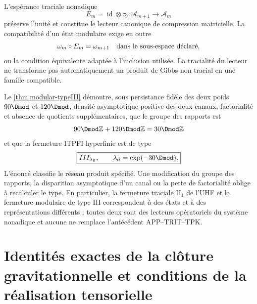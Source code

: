 L'espérance traciale nonadique
\begin{equation}
 E_m=\operatorname{id}\otimes\tau_9:
 \mathcal A_{m+1}\longrightarrow\mathcal A_m
 \label{eq:rm-info-tracial-expectation}
\end{equation}
préserve l'unité et constitue le lecteur canonique de compression
matricielle. La compatibilité d'un état modulaire exige en outre
\begin{equation}
 \omega_m\circ E_m=\omega_{m+1}
 \quad\hbox{dans le sous-espace déclaré,}
 \label{eq:rm-info-expectation-state}
\end{equation}
ou la condition équivalente adaptée à l'inclusion utilisée. La
tracialité du lecteur ne transforme pas automatiquement un produit de Gibbs non
tracial en une famille compatible.

Le \cref{thm:modular-typeIII} démontre, sous persistance fidèle des deux
poids \(90\Dmod\) et \(120\Dmod\), densité asymptotique positive des deux
canaux, factorialité et absence de quotients supplémentaires, que le groupe des
rapports est
\begin{equation}
 90\Dmod\mathbb Z+120\Dmod\mathbb Z
 =30\Dmod\mathbb Z
 \label{eq:rm-info-ratio-group}
\end{equation}
et que la fermeture ITPFI hyperfinie est de type
\begin{equation}
 \boxed{
 III_{\lambda_\partial},
 \qquad
 \lambda_\partial=\exp(-30\Dmod).}
 \label{eq:rm-info-type-iii}
\end{equation}
L'énoncé classifie le réseau produit spécifié. Une modification du
groupe des rapports, la disparition asymptotique d'un canal ou la perte de
factorialité oblige à recalculer le type. En particulier, la fermeture traciale
II\(_1\) de l'UHF et la fermeture modulaire de type III correspondent à des états et à des
représentations différents ; toutes deux sont des lecteurs opératoriels du système
nonadique et aucune ne remplace l'antécédent APP--TRIT--TPK.

\section{Identités exactes de la clôture gravitationnelle et conditions de la réalisation tensorielle}


